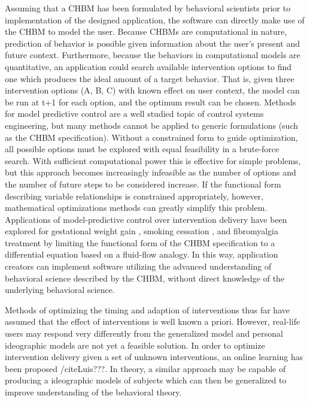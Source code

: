\documentclass[runningheads,a4paper]{llncs}
\begin{document}
Assuming that a CHBM has been formulated by behavioral scientists prior to implementation of the designed application, the software can directly make use of the CHBM to model the user.
Because CHBMs are computational in nature, prediction of behavior is possible given information about the user's present and future context.
Furthermore, because the behaviors in computational models are quantitative, an application could search available intervention options to find one which produces the ideal amount of a target behavior.
That is, given three intervention options (A, B, C) with known effect on user context, the model can be run at t+1 for each option, and the optimum result can be chosen.
Methods for model predictive control are a well studied topic of control systems engineering, but many methods cannot be applied to generic formulations (such as the CHBM specification).
Without a constrained form to guide optimization, all possible options must be explored with equal feasibility in a brute-force search.
With sufficient computational power this is effective for simple problems, but this approach becomes increasingly infeasible as the number of options and the number of future steps to be considered increase.
If the functional form describing variable relationships is constrained appropriately, however, mathematical optimizations methods can greatly simplify this problem.
Applications of model-predictive control over intervention delivery have been explored for gestational weight gain \cite{dong2013hybrid, dong2014hybrid}, smoking cessation \cite{Timms2014hybrid}, and fibromyalgia treatment \cite{Deshpande2014optimized} by limiting the functional form of the CHBM specification to a differential equation based on a fluid-flow analogy.
In this way, application creators can implement software utilizing the advanced understanding of behavioral science described by the CHBM, without direct knowledge of the underlying behavioral science.

Methods of optimizing the timing and adaption of interventions thus far have assumed that the effect of interventions is well known a priori.
However, real-life users may respond very differently from the generalized model and personal ideographic models are not yet a feasible solution.
In order to optimize intervention delivery given a set of unknown interventions, an online learning has been proposed /cite{Luis???}.
In theory, a similar approach may be capable of producing a ideographic models of subjects which can then be generalized to improve understanding of the behavioral theory.
\end{document}
